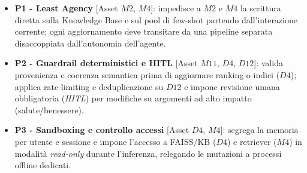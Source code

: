 \documentclass[11pt,a4paper]{article}
\begin{document}
\begin{itemize}
    \item \textbf{P1 - Least Agency} [Asset $M2$, $M4$]: impedisce a $M2$ e $M4$ la scrittura diretta sulla Knowledge Base e sul pool di few-shot partendo dall'interazione corrente; ogni aggiornamento deve transitare da una pipeline separata disaccoppiata dall'autonomia dell'agente.

    \item \textbf{P2 - Guardrail deterministici e HITL} [Asset $M11$, $D4$, $D12$]:
    valida provenienza e coerenza semantica prima di aggiornare ranking o indici ($D4$); applica rate-limiting e deduplicazione su $D12$ e impone revisione umana obbligatoria (\emph{HITL}) per modifiche su argomenti ad alto impatto (salute/benessere).

    \item \textbf{P3 - Sandboxing e controllo accessi} [Asset $D4$, $M4$]:
    segrega la memoria per utente e sessione e impone l'accesso a FAISS/KB ($D4$) e retriever ($M4$) in modalità \emph{read-only} durante l'inferenza, relegando le mutazioni a processi offline dedicati.


\end{itemize}
\end{document}
